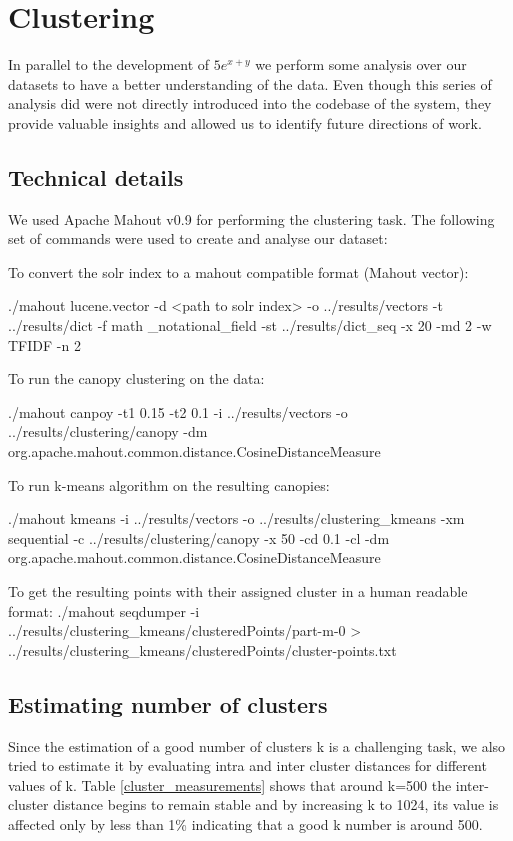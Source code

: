 \chapter{Clustering}
\label{chap-clustering}

In parallel to the development of $5e^{x+y}$ we perform some analysis over our datasets to have a better understanding of the data. Even though this series of analysis did were not directly introduced into the codebase of the system, they provide valuable insights and allowed us to identify future directions of work.

\section{Technical details}

We used Apache Mahout v0.9 for performing the clustering task. 
The following set of commands were used to create and analyse our dataset:

To convert the solr index to a mahout compatible format (Mahout vector):

\small{{\codefont ./mahout lucene.vector -d <path to solr index>  -o ../results/vectors -t ../results/dict -f math           \_notational\_field -st ../results/dict\_seq -x 20 -md 2 -w TFIDF -n 2}}

To run the canopy clustering on the data:

\small{{\codefont ./mahout canpoy -t1 0.15 -t2 0.1 -i ../results/vectors -o ../results/clustering/canopy -dm org.apache.mahout.common.distance.CosineDistanceMeasure}}

To run k-means algorithm on the resulting canopies:

\small{{\codefont ./mahout kmeans -i ../results/vectors -o ../results/clustering\_kmeans -xm sequential  -c ../results/clustering/canopy -x 50 -cd 0.1 -cl -dm org.apache.mahout.common.distance.CosineDistanceMeasure}}

To get the resulting points with their assigned cluster in a human readable format:
\small{{\codefont ./mahout seqdumper -i ../results/clustering\_kmeans/clusteredPoints/part-m-0 > ../results/clustering\_kmeans/clusteredPoints/cluster-points.txt}}

\section{Estimating number of clusters}

Since the estimation of a good number of clusters k is a challenging task, we also tried to estimate it  by evaluating intra and inter cluster distances for different values of k. Table \ref{cluster_measurements} shows that around k=500 the inter-cluster distance begins to remain stable and by increasing k to 1024, its value is affected only by less than 1\% indicating that a good k number is around 500.

